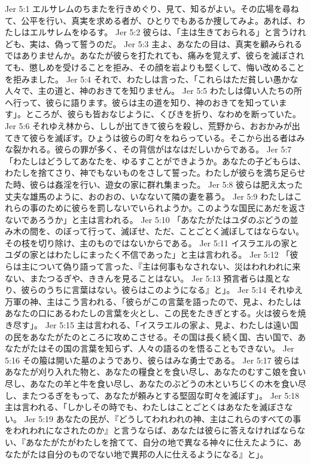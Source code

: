 Jer 5:1  エルサレムのちまたを行きめぐり、見て、知るがよい。その広場を尋ねて、公平を行い、真実を求める者が、ひとりでもあるか捜してみよ。あれば、わたしはエルサレムをゆるす。
Jer 5:2  彼らは、「主は生きておられる」と言うけれども、実は、偽って誓うのだ。
Jer 5:3  主よ、あなたの目は、真実を顧みられるではありませんか。あなたが彼らを打たれても、痛みを覚えず、彼らを滅ぼされても、懲しめを受けることを拒み、その顔を岩よりも堅くして、悔い改めることを拒みました。
Jer 5:4  それで、わたしは言った、「これらはただ貧しい愚かな人々で、主の道と、神のおきてを知りません。
Jer 5:5  わたしは偉い人たちの所へ行って、彼らに語ります。彼らは主の道を知り、神のおきてを知っています」。ところが、彼らも皆おなじように、くびきを折り、なわめを断っていた。
Jer 5:6  それゆえ林から、ししが出てきて彼らを殺し、荒野から、おおかみが出てきて彼らを滅ぼす。ひょうは彼らの町々をねらっている。そこから出る者はみな裂かれる。彼らの罪が多く、その背信がはなはだしいからである。
Jer 5:7  「わたしはどうしてあなたを、ゆるすことができようか。あなたの子どもらは、わたしを捨てさり、神でもないものをさして誓った。わたしが彼らを満ち足らせた時、彼らは姦淫を行い、遊女の家に群れ集まった。
Jer 5:8  彼らは肥え太った丈夫な雄馬のように、おのおの、いなないて隣の妻を慕う。
Jer 5:9  わたしはこれらの事のために彼らを罰しないでいられようか。このような国民にあだを返さないであろうか」と主は言われる。
Jer 5:10  「あなたがたはユダのぶどうの並み木の間を、のぼって行って、滅ぼせ、ただ、ことごとく滅ぼしてはならない。その枝を切り除け、主のものではないからである。
Jer 5:11  イスラエルの家とユダの家とはわたしにまったく不信であった」と主は言われる。
Jer 5:12  「彼らは主について偽り語って言った、『主は何事もなされない、災はわれわれに来ない、またつるぎや、ききんを見ることはない。
Jer 5:13  預言者らは風となり、彼らのうちに言葉はない。彼らはこのようになる』と」。
Jer 5:14  それゆえ万軍の神、主はこう言われる、「彼らがこの言葉を語ったので、見よ、わたしはあなたの口にあるわたしの言葉を火とし、この民をたきぎとする。火は彼らを焼き尽す」。
Jer 5:15  主は言われる、「イスラエルの家よ、見よ、わたしは遠い国の民をあなたがたのところに攻めこさせる。その国は長く続く国、古い国で、あなたがたはその国の言葉を知らず、人々の語るのを悟ることもできない。
Jer 5:16  その箙は開いた墓のようであり、彼らはみな勇士である。
Jer 5:17  彼らはあなたが刈り入れた物と、あなたの糧食とを食い尽し、あなたのむすこ娘を食い尽し、あなたの羊と牛を食い尽し、あなたのぶどうの木といちじくの木を食い尽し、またつるぎをもって、あなたが頼みとする堅固な町々を滅ぼす」。
Jer 5:18  主は言われる、「しかしその時でも、わたしはことごとくはあなたを滅ぼさない。
Jer 5:19  あなたの民が、『どうしてわれわれの神、主はこれらのすべての事をわれわれになされたのか』と言うならば、あなたは彼らに答えなければならない、『あなたがたがわたしを捨てて、自分の地で異なる神々に仕えたように、あなたがたは自分のものでない地で異邦の人に仕えるようになる』と」。
